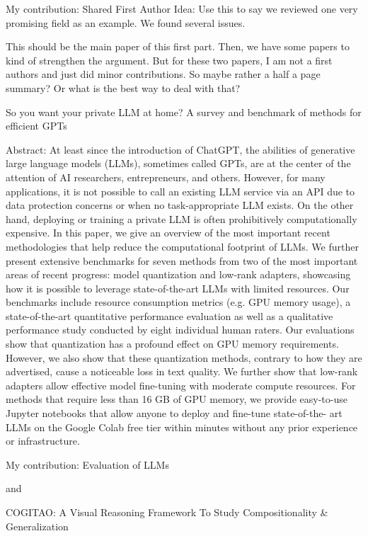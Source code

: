 My contribution: Shared First Author
Idea: Use this to say we reviewed one very promising field as an example. We found several issues.

This should be the main paper of this first part. Then, we have some papers to kind of strengthen the argument. But for these two papers, I am not a first authors and just did minor contributions. So maybe rather a half a page summary? Or what is the best way to deal with that?

So you want your private LLM at home? A survey and benchmark of methods for efficient GPTs

Abstract: At least since the introduction of ChatGPT, the
abilities of generative large language models (LLMs), sometimes
called GPTs, are at the center of the attention of AI researchers,
entrepreneurs, and others. However, for many applications, it
is not possible to call an existing LLM service via an API due
to data protection concerns or when no task-appropriate LLM
exists. On the other hand, deploying or training a private LLM is
often prohibitively computationally expensive. In this paper, we
give an overview of the most important recent methodologies that
help reduce the computational footprint of LLMs. We further
present extensive benchmarks for seven methods from two of
the most important areas of recent progress: model quantization
and low-rank adapters, showcasing how it is possible to leverage
state-of-the-art LLMs with limited resources. Our benchmarks
include resource consumption metrics (e.g. GPU memory usage),
a state-of-the-art quantitative performance evaluation as well as
a qualitative performance study conducted by eight individual
human raters. Our evaluations show that quantization has a
profound effect on GPU memory requirements. However, we also
show that these quantization methods, contrary to how they are
advertised, cause a noticeable loss in text quality. We further
show that low-rank adapters allow effective model fine-tuning
with moderate compute resources. For methods that require less
than 16 GB of GPU memory, we provide easy-to-use Jupyter
notebooks that allow anyone to deploy and fine-tune state-of-the-
art LLMs on the Google Colab free tier within minutes without
any prior experience or infrastructure.

My contribution: Evaluation of LLMs

and

COGITAO: A Visual Reasoning Framework To Study Compositionality & Generalization

